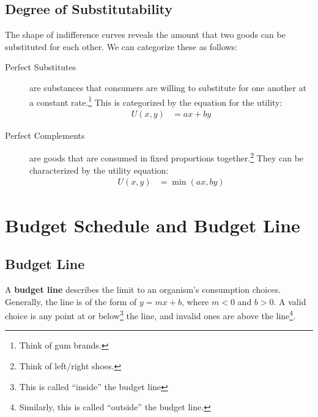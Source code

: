                 \subsection{Degree of Substitutability} %
                \label{sub:degree_of_substitutability}
                    The shape of indifference curves reveals the amount that two goods can be substituted for each other.
                    We can categorize these as follows:
                    \begin{description}
                        \item[Perfect Substitutes] are substances that consumers are willing to substitute for one another at a constant rate.\footnote{Think of gum brands.}
                        This is categorized by the equation for the utility:
                        \begin{align*}
                            U(x, y) &= ax + by
                        \end{align*}
                        \item[Perfect Complements] are goods that are consumed in fixed proportions together.\footnote{Think of left/right shoes.}
                        They can be characterized by the utility equation:
                        \begin{align*}
                            U(x, y) &= \min(ax, by)
                        \end{align*}
                    \end{description}

            \section{Budget Schedule and Budget Line} %
            \label{sec:budget_schedule_and_budget_line}
                \subsection{Budget Line} %
                \label{sub:budget_line}
                    A \textbf{budget line} describes the limit to an organism's consumption choices.
                    Generally, the line is of the form of $y = mx + b$, where $m < 0$ and $b > 0$.
                    A valid choice is any point at or below\footnote{This is called ``inside'' the budget line} the line, and invalid ones are above the line\footnote{Similarly, this is called ``outside'' the budget line.}.

